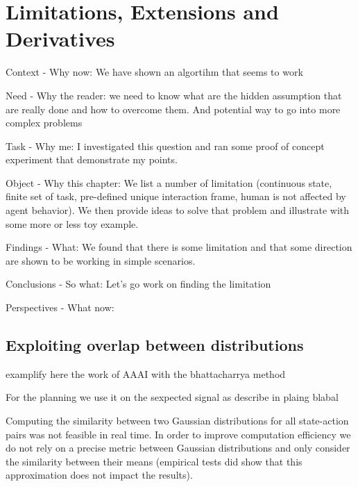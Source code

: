 
%
\chapter{Limitations, Extensions and Derivatives}
\label{chapter:limitations}
\minitoc

Context - Why now: We have shown an algortihm that seems to work

Need - Why the reader: we need to know what are the hidden assumption that are really done and how to overcome them. And potential way to go into more complex problems

Task - Why me: I investigated this question and ran some proof of concept experiment that demonstrate my points.

Object - Why this chapter: We list a number of limitation (continuous state, finite set of task, pre-defined unique interaction frame, human is not affected by agent behavior). We then provide ideas to solve that problem and illustrate with some more or less toy example.

Findings - What: We found that there is some limitation and that some direction are shown to be working in simple scenarios.

Conclusions - So what: Let's go work on finding the limitation

Perspectives - What now: 


\section{Exploiting overlap between distributions}
\label{chapter:limitations:overlap}

examplify here the work of AAAI with the bhattacharrya method


For the planning we use it on the sexpected signal as describe in plaing blabal

Computing the similarity between two Gaussian distributions for all state-action pairs was not feasible in real time. In order to improve computation efficiency we do not rely on a precise metric between Gaussian distributions and only consider the similarity between their means (empirical tests did show that this approximation does not impact the results).


